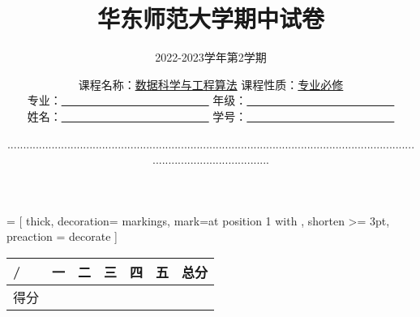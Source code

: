 \documentclass[list, windows]{BHCexam}
\begin{document}
 = [
thick,
decoration={
	markings,
	mark=at position 1 with {
	}
},
shorten >= 3pt, preaction = {decorate}
					]
\title{华东师范大学期中试卷}
\subtitle{2022-2023学年第2学期}
\author{
课程名称：\underline{数据科学与工程算法}	课程性质：\underline{专业必修}\\
专业：\underline{~~~~~~~~~~~~~~~~~~~~~~~~~~}	年级：\underline{~~~~~~~~~~~~~~~~~~~~~~~~~~}	\\
姓名：\underline{~~~~~~~~~~~~~~~~~~~~~~~~~~}	学号：\underline{~~~~~~~~~~~~~~~~~~~~~~~~~~}	
}
\date{......................................................................................................................................................................}
\maketitle
\begin{center}
    \begin{tabular}{| l | l | l | l | l | l | l |}
    \hline
	/& 一 & 二 & 三 & 四 & 五 & 总分 \\ \hline
    得分 & ~ & ~ & ~ & ~ & ~ & ~\\ \hline
    \end{tabular}
\end{center}
\end{document}

